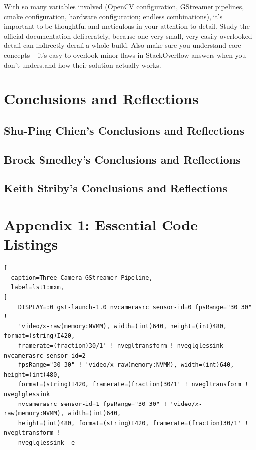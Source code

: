 \documentclass[letterpaper,10pt,serif,draftclsnofoot,onecolumn,compsoc,titlepage]{IEEEtran}
\begin{document}
With so many variables involved (OpenCV configuration, GStreamer pipelines, cmake configuration, hardware configuration; endless combinations), it's important to be thoughtful and meticulous in your attention to detail. Study the official documentation deliberately, because one very small, very easily-overlooked detail can indirectly derail a whole build. Also make sure you understand core concepts -- it's easy to overlook minor flaws in StackOverflow answers when you don't understand how their solution actually works.

\newpage

\section{Conclusions and Reflections}

	\subsection{Shu-Ping Chien's Conclusions and Reflections}

		

	\newpage

	\subsection{Brock Smedley's Conclusions and Reflections}

		

	\newpage
	
	\subsection{Keith Striby's Conclusions and Reflections}

		

	\newpage

\section{Appendix 1: Essential Code Listings}
\begin{lstlisting}[
  caption=Three-Camera GStreamer Pipeline,
  label=lst1:mxm,
]
	DISPLAY=:0 gst-launch-1.0 nvcamerasrc sensor-id=0 fpsRange="30 30" ! 
	'video/x-raw(memory:NVMM), width=(int)640, height=(int)480, format=(string)I420, 
	framerate=(fraction)30/1' ! nvegltransform ! nveglglessink  nvcamerasrc sensor-id=2 
	fpsRange="30 30" ! 'video/x-raw(memory:NVMM), width=(int)640, height=(int)480, 
	format=(string)I420, framerate=(fraction)30/1' ! nvegltransform ! nveglglessink 
	nvcamerasrc sensor-id=1 fpsRange="30 30" ! 'video/x-raw(memory:NVMM), width=(int)640, 
	height=(int)480, format=(string)I420, framerate=(fraction)30/1' ! nvegltransform ! 
	nveglglessink -e
\end{lstlisting}
\end{document}

